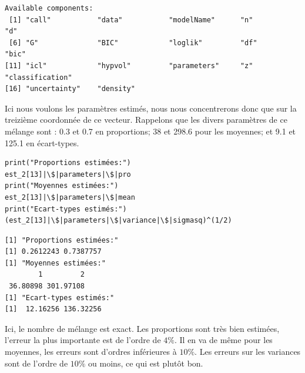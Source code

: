 \documentclass[frenchb]{report}
\newcommand{\1}{\mathbbm{1}}
\theoremstyle{definition}\newtheorem{defn}{Définition}
\theoremstyle{definition}\newtheorem{exm}{Exemple}
\theoremstyle{definition}\newtheorem{nota}{Notation}
\theoremstyle{definition}\newtheorem{rem}{Remarque}
\begin{document}
\begin{appendices}
\begin{verbatim}
Available components: 
 [1] "call"           "data"           "modelName"      "n"              "d"             
 [6] "G"              "BIC"            "loglik"         "df"             "bic"           
[11] "icl"            "hypvol"         "parameters"     "z"              "classification"
[16] "uncertainty"    "density"
\end{verbatim}
%
Ici nous voulons les paramètres estimés, nous nous concentrerons donc que sur la treizième coordonnée de ce vecteur.\newline
Rappelons que les divers paramètres de ce mélange sont : 0.3 et 0.7 en proportions; 38 et 298.6 pour les moyennes; et 9.1 et 125.1 en écart-types.
\begin{lstlisting}
print("Proportions estimées:")
est_2[13]|\$|parameters|\$|pro
print("Moyennes estimées:")
est_2[13]|\$|parameters|\$|mean
print("Ecart-types estimés:")
(est_2[13]|\$|parameters|\$|variance|\$|sigmasq)^(1/2)
\end{lstlisting}
\begin{verbatim}
[1] "Proportions estimées:"
[1] 0.2612243 0.7387757
[1] "Moyennes estimées:"
        1         2 
 36.80898 301.97108 
[1] "Ecart-types estimés:"
[1]  12.16256 136.32256
\end{verbatim}
Ici, le nombre de mélange est exact. Les proportions sont très bien estimées, l'erreur la plus importante est de l'ordre de $4\%$. Il en va de même pour les moyennes, les erreurs sont d'ordres inférieures à $10\%$. Les erreurs sur les variances sont de l'ordre de $10\%$ ou moins, ce qui est plutôt bon. 
\newpage

\end{appendices}
\end{document}
